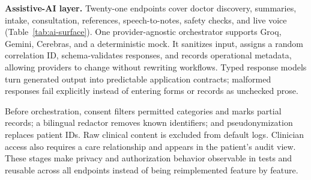 \documentclass[preprint,12pt,a4paper]{elsarticle}
\begin{document}
\textbf{Assistive-AI layer.} Twenty-one endpoints cover doctor discovery, summaries, intake,
consultation, references, speech-to-notes, safety checks, and live voice
(Table~\ref{tab:ai-surface}). One provider-agnostic orchestrator supports Groq, Gemini,
Cerebras, and a deterministic mock. It sanitizes input, assigns a random correlation ID,
schema-validates responses, and records operational metadata, allowing providers to change
without rewriting workflows. Typed response models turn generated output into predictable
application contracts; malformed responses fail explicitly instead of entering forms or
records as unchecked prose.

Before orchestration, consent filters permitted categories and marks partial records; a
bilingual redactor removes known identifiers; and pseudonymization replaces patient IDs.
Raw clinical content is excluded from default logs. Clinician access also requires a care
relationship and appears in the patient's audit view. These stages make privacy and
authorization behavior observable in tests and reusable across all endpoints instead of
being reimplemented feature by feature.
\end{document}
